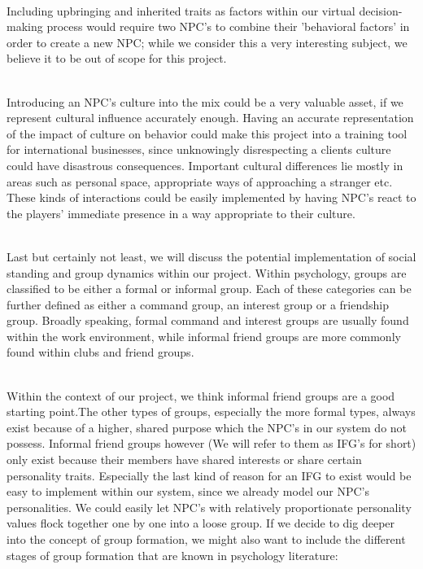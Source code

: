\documentclass[11pt]{article} %
\begin{document}
~\\
Including upbringing and inherited traits as factors within our virtual decision-making process would require two NPC's to combine their 'behavioral factors' in order to create a new NPC; while we consider this a very interesting subject, we believe it to be out of scope for this project. 

~\\
Introducing an NPC's culture into the mix could be a very valuable asset, if we represent cultural influence accurately enough. Having an accurate representation of the impact of culture on behavior could make this project into a training tool for international businesses, since unknowingly disrespecting a clients culture could have disastrous consequences. Important cultural differences lie mostly in areas such as personal space, appropriate ways of approaching a stranger etc. These kinds of interactions could be easily implemented by having NPC's react to the players' immediate presence in a way appropriate to their culture. %

~\\
Last but certainly not least, we will discuss the potential implementation of social standing and group dynamics within our project. Within psychology, groups are classified to be either a formal or informal group. Each of these categories can be further defined as either a command group, an interest group or a friendship group. Broadly speaking, formal command and interest groups are usually found within the work environment, while informal friend groups are more commonly found within clubs and friend groups. 

~\\
Within the context of our project, we think informal friend groups are a good starting point.The other types of groups, especially the more formal types, always exist because of a higher, shared purpose which the NPC's in our system do not possess. Informal friend groups however  (We will refer to them as IFG's for short) only exist because their members have shared interests or share certain personality traits. Especially the last kind of reason for an IFG to exist would be easy to implement within our system, since we already model our NPC's personalities. We could easily let NPC's with relatively proportionate personality values flock together one by one into a loose group. If we decide to dig deeper into the concept of group formation, we might also want to include the different stages of group formation that are known in psychology literature: %
\end{document}

